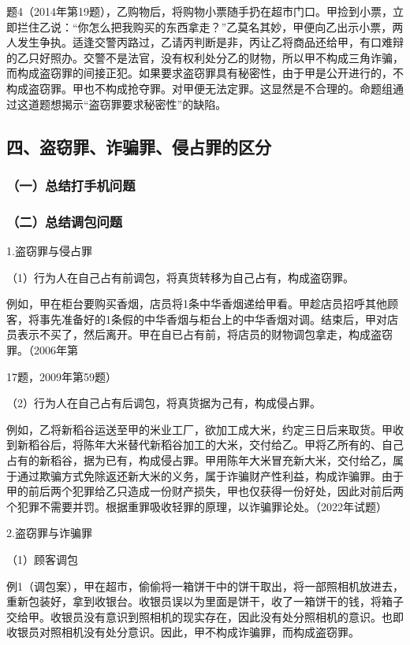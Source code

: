 题4（2014年第19题），乙购物后，将购物小票随手扔在超市门口。甲捡到小票，立即拦住乙说：“你怎么把我购买的东西拿走？”乙莫名其妙，甲便向乙出示小票，两人发生争执。适逢交警丙路过，乙请丙判断是非，丙让乙将商品还给甲，有口难辩的乙只好照办。交警不是法官，没有权利处分乙的财物，所以甲不构成三角诈骗，而构成盗窃罪的间接正犯。如果要求盗窃罪具有秘密性，由于甲是公开进行的，不构成盗窃罪。甲也不构成抢夺罪。对甲便无法定罪。这显然是不合理的。命题组通过这道题想揭示“盗窃罪要求秘密性”的缺陷。

\subsection*{四、盗窃罪、诈骗罪、侵占罪的区分}

\subsubsection*{（一）总结打手机问题}


\subsubsection*{（二）总结调包问题}

1.盗窃罪与侵占罪

（1）行为人在自己占有前调包，将真货转移为自己占有，构成盗窃罪。

例如，甲在柜台要购买香烟，店员将1条中华香烟递给甲看。甲趁店员招呼其他顾客，将事先准备好的1条假的中华香烟与柜台上的中华香烟对调。结束后，甲对店员表示不买了，然后离开。甲在自已占有前，将店员的财物调包拿走，构成盗窃罪。（2006年第

17题，2009年第59题）

（2）行为人在自己占有后调包，将真货据为己有，构成侵占罪。

例如，乙将新稻谷运送至甲的米业工厂，欲加工成大米，约定三日后来取货。甲收到新稻谷后，将陈年大米替代新稻谷加工的大米，交付给乙。甲将乙所有的、自己占有的新稻谷，据为已有，构成侵占罪。甲用陈年大米冒充新大米，交付给乙，属于通过欺骗方式免除返还新大米的义务，属于诈骗财产性利益，构成诈骗罪。由于甲的前后两个犯罪给乙只造成一份财产损失，甲也仅获得一份好处，因此对前后两个犯罪不需要并罚。根据重罪吸收轻罪的原理，以诈骗罪论处。（2022年试题）

2.盗窃罪与诈骗罪

（1）顾客调包

例1（调包案），甲在超市，偷偷将一箱饼干中的饼干取出，将一部照相机放进去，重新包装好，拿到收银台。收银员误以为里面是饼干，收了一箱饼干的钱，将箱子交给甲。收银员没有意识到照相机的现实存在，因此没有处分照相机的意识。也即收银员对照相机没有处分意识。因此，甲不构成诈骗罪，而构成盗窃罪。

